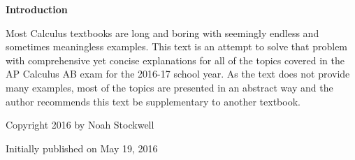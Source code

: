 \par \textbf{Introduction}
\newline
\vspace{0.125in}
\par Most Calculus textbooks are long and boring with seemingly endless and sometimes meaningless examples. This text is an attempt to solve that problem with comprehensive yet concise explanations for all of the topics covered in the AP Calculus AB exam for the 2016-17 school year. As the text does not provide many examples, most of the topics are presented in an abstract way and the author recommends this text be supplementary to another textbook.
\vfill
\par Copyright 2016 by Noah Stockwell
\par Initially published on May 19, 2016